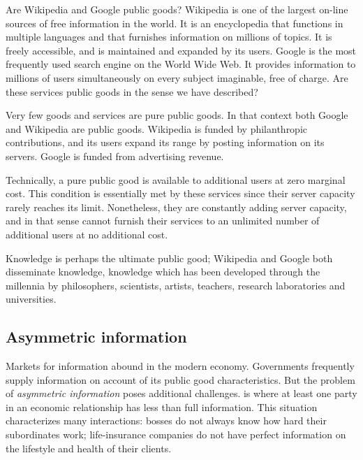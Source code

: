 \begin{ApplicationBox}{Are Wikipedia and Google public goods? \label{app:wikigoogle}}
Wikipedia is one of the largest on-line sources of free information in the world. It is an encyclopedia that functions in multiple languages and that furnishes information on millions of topics. It is freely accessible, and is maintained and expanded by its users. Google is the most frequently used search engine on the World Wide Web. It provides information to millions of users simultaneously on every subject imaginable, free of charge. Are these services public goods in the sense we have described?

\bigskip
Very few goods and services are pure public goods. In that context both Google and Wikipedia are public goods. Wikipedia is funded by philanthropic contributions, and its users expand its range by posting information on its servers. Google is funded from advertising revenue.

\bigskip
Technically, a pure public good is available to additional users at zero marginal cost. This condition is essentially met by these services since their server capacity rarely reaches its limit. Nonetheless, they are constantly adding server capacity, and in that sense cannot furnish their services to an unlimited number of additional users at no additional cost.

\bigskip
Knowledge is perhaps the ultimate public good; Wikipedia and Google both disseminate knowledge, knowledge which has been developed through the millennia by philosophers, scientists, artists, teachers, research laboratories and universities.
\end{ApplicationBox}

\subsection*{Asymmetric information}

Markets for information abound in the modern economy. Governments frequently supply information on account of its public good characteristics. But the problem of \textit{asymmetric information} poses additional challenges.  is where at least one party in an economic relationship has less than full information. This situation characterizes many interactions: bosses do not always know how hard their subordinates work; life-insurance companies do not have perfect information on the lifestyle and health of their clients. 

